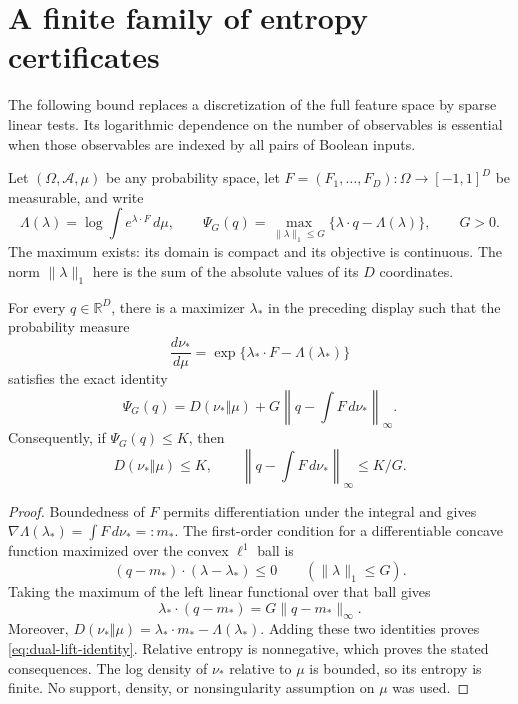 \section{A finite family of entropy certificates}\label{sec:sparse-dual}
The following bound replaces a discretization of the full feature space by
sparse linear tests. Its logarithmic dependence on the number of observables
is essential when those observables are indexed by all pairs of Boolean
inputs.

Let $(\Omega,\mathcal A,\mu)$ be any probability space, let
$F=(F_1,\ldots,F_D):\Omega\to[-1,1]^D$ be measurable, and write
\[
 \Lambda(\lambda)=\log\int e^{\lambda\cdot F}\,d\mu,
 \qquad
 \Psi_G(q)=\max_{\|\lambda\|_1\leq G}
       \{\lambda\cdot q-\Lambda(\lambda)\},\qquad G>0.
\]
The maximum exists: its domain is compact and its objective is continuous.
The norm $\|\lambda\|_1$ here is the sum of the absolute values of its
$D$ coordinates.

\begin{lemma}
\label{lem:bounded-dual-lift}
For every $q\in\mathbb R^D$, there is a maximizer $\lambda_*$ in the
preceding display such that the probability measure
\[
 \frac{d\nu_*}{d\mu}
     =\exp\{\lambda_*\cdot F-\Lambda(\lambda_*)\}
\]
satisfies the exact identity
\begin{equation}\label{eq:dual-lift-identity}
 \Psi_G(q)
   =D(\nu_*\Vert\mu)
      +G\left\|q-\int F\,d\nu_*\right\|_\infty.
\end{equation}
Consequently, if $\Psi_G(q)\leq K$, then
\[
 D(\nu_*\Vert\mu)\leq K,
 \qquad
 \left\|q-\int F\,d\nu_*\right\|_\infty\leq K/G.
\]
\end{lemma}
\begin{proof}
Boundedness of $F$ permits differentiation under the integral and gives
$\nabla\Lambda(\lambda_*)=\int F\,d\nu_*=:m_*$. The first-order
condition for a differentiable concave function maximized over the convex
$\ell^1$ ball is
\[
 (q-m_*)\cdot(\lambda-\lambda_*)\leq0
       \qquad(\|\lambda\|_1\leq G).
\]
Taking the maximum of the left linear functional over that ball gives
\[
 \lambda_*\cdot(q-m_*)=G\|q-m_*\|_\infty.
\]
Moreover,
$D(\nu_*\Vert\mu)=\lambda_*\cdot m_*-\Lambda(\lambda_*)$.
Adding these two identities proves \eqref{eq:dual-lift-identity}.
Relative entropy is nonnegative, which proves the stated consequences.
The log density of $\nu_*$ relative to $\mu$ is bounded, so its entropy
is finite. No support, density, or nonsingularity assumption on $\mu$
was used.
\end{proof}

